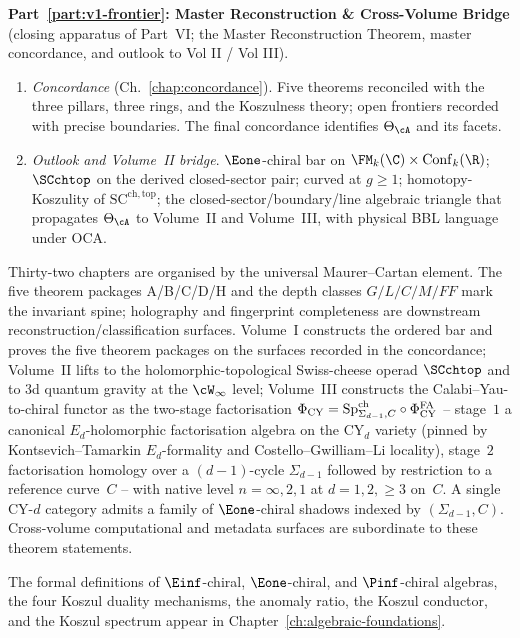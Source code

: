 \textbf{Part~\ref{part:v1-frontier}: Master Reconstruction \& Cross-Volume Bridge} (closing apparatus of Part~VI; the Master Reconstruction Theorem, master concordance, and outlook to Vol II / Vol III).
\begin{enumerate}[label=\textup{\arabic*.}, start=31]
\item \emph{Concordance} (Ch.~\ref{chap:concordance}).
 Five theorems reconciled with the three pillars, three rings, and
 the Koszulness theory; open frontiers recorded with precise
 boundaries. The final concordance identifies $\Theta_\cA$ and its facets.

\item \emph{Outlook and Volume~II bridge}.
 $\Eone$-chiral bar on $\FM_k(\C) \times \operatorname{Conf}_k(\R)$;
 $\SCchtop$ on the derived closed-sector pair; curved at
 $g \geq 1$; homotopy-Koszulity of
 $\mathrm{SC}^{\mathrm{ch,top}}$; the closed-sector/boundary/line
 algebraic triangle that propagates $\Theta_\cA$ to Volume~II and
 Volume~III, with physical BBL language under OCA.
\end{enumerate}

Thirty-two chapters are organised by the universal Maurer--Cartan
element. The five theorem packages
A/B/C/D/H and the depth classes $G/L/C/M/FF$ mark the invariant
spine; holography and fingerprint completeness are downstream
reconstruction/classification surfaces. Volume~I constructs the
ordered bar and proves the five theorem packages on the surfaces
recorded in the concordance; Volume~II lifts to the
holomorphic-topological Swiss-cheese operad $\SCchtop$ and to 3d
quantum gravity at the $\cW_\infty$ level; Volume~III constructs the
Calabi--Yau-to-chiral functor as the two-stage factorisation
$\Phi_{\mathrm{CY}} = \mathrm{Sp}^{\mathrm{ch}}_{\Sigma_{d-1}, C} \circ
\Phi_{\mathrm{CY}}^{\mathrm{FA}}$ -- stage~$1$ a canonical $E_d$-holomorphic
factorisation algebra on the CY$_d$ variety (pinned by
Kontsevich--Tamarkin $E_d$-formality and Costello--Gwilliam--Li
locality), stage~$2$ factorisation homology over a $(d-1)$-cycle
$\Sigma_{d-1}$ followed by restriction to a reference curve~$C$ --
with native level $n = \infty, 2, 1$ at $d = 1, 2, \geq 3$ on~$C$.
A single CY-$d$ category admits a family of $\Eone$-chiral shadows
indexed by $(\Sigma_{d-1}, C)$. Cross-volume computational and
metadata surfaces are subordinate to these theorem statements.

The formal definitions of $\Einf$-chiral, $\Eone$-chiral, and $\Pinf$-chiral algebras, the four Koszul duality mechanisms, the anomaly ratio, the Koszul conductor, and the Koszul spectrum appear in Chapter~\ref{ch:algebraic-foundations}.

